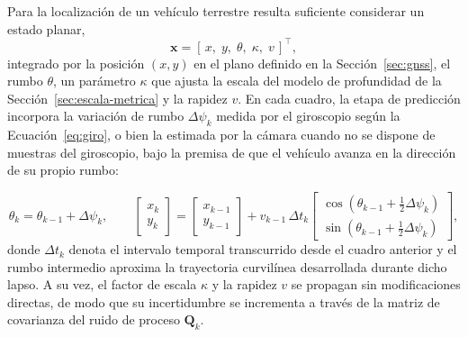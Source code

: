 Para la localización de un vehículo terrestre resulta suficiente considerar un estado planar,
\begin{equation}
\mathbf{x} = \left[\, x,\; y,\; \theta,\; \kappa,\; v \,\right]^{\top},
\label{eq:estado-ekf}
\end{equation}
integrado por la posición $(x,y)$ en el plano definido en la Sección~\ref{sec:gnss}, el rumbo $\theta$, un parámetro $\kappa$ que ajusta la escala del modelo de profundidad de la Sección~\ref{sec:escala-metrica} y la rapidez $v$.
En cada cuadro, la etapa de predicción incorpora la variación de rumbo $\Delta\psi_k$ medida por el giroscopio según la Ecuación~\eqref{eq:giro}, o bien la estimada por la cámara cuando no se dispone de muestras del giroscopio, bajo la premisa de que el vehículo avanza en la dirección de su propio rumbo:

\begin{equation}
\theta_k = \theta_{k-1} + \Delta\psi_k,
\qquad
\begin{bmatrix} x_k \\ y_k \end{bmatrix}
=
\begin{bmatrix} x_{k-1} \\ y_{k-1} \end{bmatrix}
+ v_{k-1}\,\Delta t_k
\begin{bmatrix} \cos\!\left(\theta_{k-1} + \tfrac{1}{2}\Delta\psi_k\right) \\ \sin\!\left(\theta_{k-1} + \tfrac{1}{2}\Delta\psi_k\right) \end{bmatrix},
\label{eq:modelo-plano}
\end{equation}
donde $\Delta t_k$ denota el intervalo temporal transcurrido desde el cuadro anterior y el rumbo intermedio aproxima la trayectoria curvilínea desarrollada durante dicho lapso.
A su vez, el factor de escala $\kappa$ y la rapidez $v$ se propagan sin modificaciones directas, de modo que su incertidumbre se incrementa a través de la matriz de covarianza del ruido de proceso $\mathbf{Q}_k$.

